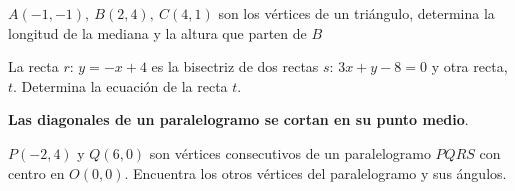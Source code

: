 \vspace{-8mm}
\begin{flushright}
\begin{footnotesize} \textcolor{gris}{}	\end{footnotesize}
\end{flushright}

\begin{mipropuesto}

$A(-1,-1),\ B(2,4),\ C(4,1)$ son los vértices de un triángulo, determina la longitud de la mediana y la altura que parten de $B$

\end{mipropuesto}

\vspace{-8mm}
\begin{flushright}
\begin{footnotesize} \textcolor{gris}{}	\end{footnotesize}
\end{flushright}

\begin{mipropuesto}

La recta $r:\, y=-x+4$ es la bisectriz de dos rectas $s:\, 3x+y-8=0$  y otra recta, $t$. Determina la ecuación de la recta $t$.

\end{mipropuesto}

\vspace{-8mm}
\begin{flushright}
\begin{footnotesize} \textcolor{gris}{}	\end{footnotesize}
\end{flushright}

\vspace{5mm}
\begin{adjustwidth}{30pt}{30pt}
\begin{destacado}
\textbf{\textsf{Las diagonales de un paralelogramo se cortan en su punto medio}}.	
\end{destacado}
\end{adjustwidth}
\vspace{5mm}

\begin{mipropuesto}

$P(-2,4)$ y $Q(6,0)$ son vértices consecutivos de un paralelogramo $PQRS$ con centro en $O(0,0)$. Encuentra los otros vértices del paralelogramo y sus ángulos.

\end{mipropuesto}

